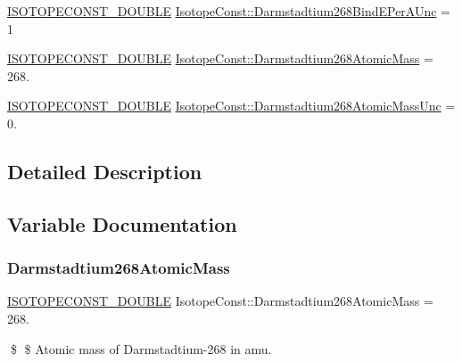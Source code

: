 \begin{DoxyCompactItemize}
\item 
\mbox{\hyperlink{group___isotope_const-_macros_ga8f45a7272ce02c0b4c65c44636ed719a}{I\+S\+O\+T\+O\+P\+E\+C\+O\+N\+S\+T\+\_\+\+D\+O\+U\+B\+LE}} \mbox{\hyperlink{group___isotope_const-_darmstadtium-_ds268_gaf2bd77b743cb0c51c90ed266e4350efc}{Isotope\+Const\+::\+Darmstadtium268\+Bind\+E\+Per\+A\+Unc}} = 1
\item 
\mbox{\hyperlink{group___isotope_const-_macros_ga8f45a7272ce02c0b4c65c44636ed719a}{I\+S\+O\+T\+O\+P\+E\+C\+O\+N\+S\+T\+\_\+\+D\+O\+U\+B\+LE}} \mbox{\hyperlink{group___isotope_const-_darmstadtium-_ds268_gabebc807ddc1eaf528a696cce60e227c6}{Isotope\+Const\+::\+Darmstadtium268\+Atomic\+Mass}} = 268.
\item 
\mbox{\hyperlink{group___isotope_const-_macros_ga8f45a7272ce02c0b4c65c44636ed719a}{I\+S\+O\+T\+O\+P\+E\+C\+O\+N\+S\+T\+\_\+\+D\+O\+U\+B\+LE}} \mbox{\hyperlink{group___isotope_const-_darmstadtium-_ds268_ga9af9d818bb92c3ca7af4f3a2321981e3}{Isotope\+Const\+::\+Darmstadtium268\+Atomic\+Mass\+Unc}} = 0.
\end{DoxyCompactItemize}


\subsection{Detailed Description}


\subsection{Variable Documentation}
\mbox{\label{group___isotope_const-_darmstadtium-_ds268_gabebc807ddc1eaf528a696cce60e227c6}} 
\subsubsection{\texorpdfstring{Darmstadtium268\+Atomic\+Mass}{Darmstadtium268AtomicMass}}
{\footnotesize\ttfamily \mbox{\hyperlink{group___isotope_const-_macros_ga8f45a7272ce02c0b4c65c44636ed719a}{I\+S\+O\+T\+O\+P\+E\+C\+O\+N\+S\+T\+\_\+\+D\+O\+U\+B\+LE}} Isotope\+Const\+::\+Darmstadtium268\+Atomic\+Mass = 268.}

\$ \$ Atomic mass of Darmstadtium-\/268 in amu. \mbox{\label{group___isotope_const-_darmstadtium-_ds268_ga9af9d818bb92c3ca7af4f3a2321981e3}} 
